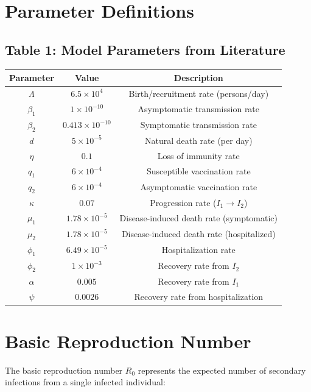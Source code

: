 \documentclass[12pt,a4paper]{report}
\begin{document}
\section{Parameter Definitions}

\subsection{Table 1: Model Parameters from Literature}

\begin{center}
\begin{tabular}{|c|c|c|}
\hline
\textbf{Parameter} & \textbf{Value} & \textbf{Description} \\
\hline
$\Lambda$ & $6.5 \times 10^4$ & Birth/recruitment rate (persons/day) \\
$\beta_1$ & $1 \times 10^{-10}$ & Asymptomatic transmission rate \\
$\beta_2$ & $0.413 \times 10^{-10}$ & Symptomatic transmission rate \\
$d$ & $5 \times 10^{-5}$ & Natural death rate (per day) \\
$\eta$ & $0.1$ & Loss of immunity rate \\
$q_1$ & $6 \times 10^{-4}$ & Susceptible vaccination rate \\
$q_2$ & $6 \times 10^{-4}$ & Asymptomatic vaccination rate \\
$\kappa$ & $0.07$ & Progression rate ($I_1 \to I_2$) \\
$\mu_1$ & $1.78 \times 10^{-5}$ & Disease-induced death rate (symptomatic) \\
$\mu_2$ & $1.78 \times 10^{-5}$ & Disease-induced death rate (hospitalized) \\
$\phi_1$ & $6.49 \times 10^{-5}$ & Hospitalization rate \\
$\phi_2$ & $1 \times 10^{-3}$ & Recovery rate from $I_2$ \\
$\alpha$ & $0.005$ & Recovery rate from $I_1$ \\
$\psi$ & $0.0026$ & Recovery rate from hospitalization \\
\hline
\end{tabular}
\end{center}

\section{Basic Reproduction Number}

The basic reproduction number $R_0$ represents the expected number of secondary infections from a single infected individual:
\end{document}
